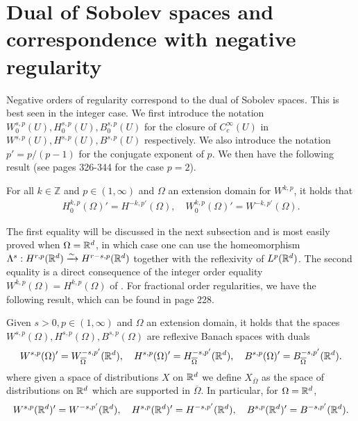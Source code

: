\documentclass[
    a4paper,
    DIV=14,
    abstract=true,
    numbers=noenddot
]{scrartcl}
\begin{document}
\section{Dual of Sobolev spaces and correspondence with negative regularity}\label{dual sec}
Negative orders of regularity correspond to the dual of Sobolev spaces. This is best seen in the integer case. We first introduce the notation $W^{s,p}_0(U),H^{s,p}_0(U),B^{s,p}_0(U)$ for the closure of $C_c^\infty(U)$ in $W^{s,p}(U),H^{s,p}(U),B^{s,p}(U)$ respectively. We also introduce the notation $p' = p/(p-1)$ for the conjugate exponent of $p$. We then have the following result (see \cite{evans2022partial} pages 326-344 for the case $p=2$).
\begin{theorem}\label{dual of integer sobolev}
    For all $k \in \mathbb{Z}$ and $p \in (1,\infty)$  and $\Omega$ an extension domain for $W^{k,p}$, it holds that
    \begin{align*}
        H^{k,p}_0(\Omega )' = H^{-k,p'}(\Omega ), \quad W^{k,p}_0(\Omega )' = W^{-k,p'}(\Omega ).
    \end{align*}
\end{theorem}
The first equality will be discussed in the next subsection and is most easily proved when $\Omega =\mathbb{R}^d$, in which case one can use the homeomorphism $\Lambda ^s: H^{r,p}(\mathbb{R}^d )\xrightarrow{\sim} H^{r-s,p}(\mathbb{R}^d )$ together with the reflexivity of $L^p(\mathbb{R}^d )$. The second equality is a direct consequence of the integer order equality $W^{k,p}(\Omega )=H^{k,p}(\Omega )$ of . For fractional order regularities, we have the following result, which can be found in \cite{agranovich2015sobolev} page 228.
\begin{theorem}
    Given $s>0, p \in (1,\infty)$ and $\Omega$ an extension domain, it holds that the spaces $W^{s,p}(\Omega ),H^{s,p}(\Omega ),B^{s,p}(\Omega )$ are reflexive Banach spaces with duals
    \begin{align*}
        W^{s,p}(\Omega )'=	W^{-s,p'}_{\overline{\Omega } }(\mathbb{R}^d ), \quad H^{s,p}(\Omega )' = H^{-s,p'}_{\overline{\Omega } }(\mathbb{R}^d ), \quad B^{s,p}(\Omega )' = B^{-s,p'}_{\overline{\Omega } }(\mathbb{R}^d ).
    \end{align*}
    where given a space of distributions $X$ on $\mathbb{R}^d$ we define $X_{\overline{\Omega }}$ as the space of distributions on $\mathbb{R}^d$ which are supported in $\overline{\Omega }$. In particular, for $\Omega =\mathbb{R}^d$,
    \begin{align*}
        W^{s,p}(\mathbb{R}^d )'=	W^{-s,p'}(\mathbb{R}^d ), \quad H^{s,p}(\mathbb{R}^d )' = H^{-s,p'}(\mathbb{R}^d ), \quad B^{s,p}(\mathbb{R}^d )' = B^{-s,p'}(\mathbb{R}^d ).
    \end{align*}
\end{theorem}
\end{document}
